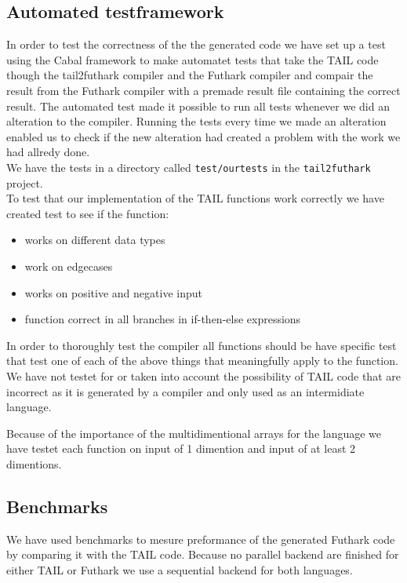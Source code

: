 \documentclass[11pt]{article}
\begin{document}
\subsection{Automated testframework}
In order to test the correctness of the the generated code we have set up a test using the Cabal framework to make automatet tests that take the TAIL code though the tail2futhark compiler and the Futhark compiler and compair the result from the Futhark compiler with a premade result file containing the correct result. The automated test made it possible to run all tests whenever we did an alteration to the compiler. 
Running the tests every time we made an alteration enabled us to check if the new alteration had created a problem with the work we had allredy done. \\

We have the tests in a directory called {\tt test/ourtests} in the {\tt tail2futhark} project. \\

To test that our implementation of the TAIL functions work correctly we have created test to see if the function:
\begin{itemize}
\item works on different data types
\item work on edgecases
\item works on positive and negative input
\item function correct in all branches in if-then-else expressions
\end{itemize}
In order to thoroughly test the compiler all functions should be have specific test that test one of each of the above things
that meaningfully apply to the function. \\

We have not testet for or taken into account the possibility of TAIL code that are incorrect as it is generated by a compiler and only used as an intermidiate language. 

Because of the importance of the multidimentional arrays for the language we have testet each function on input of 1 dimention and input of at least 2 dimentions. 

\subsection{Benchmarks}
We have used benchmarks to mesure preformance of the generated Futhark code by comparing it with the TAIL code.
Because no parallel backend are finished for either TAIL or Futhark we use a sequential backend for both languages. \\
\end{document}
